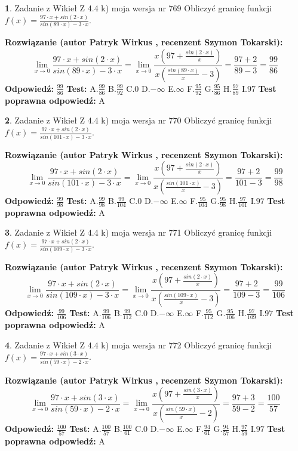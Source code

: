 \documentclass[12pt, a4paper]{article}
\theoremstyle{definition} %
\newtheorem{zad}{}
\newcommand{\zadStart}[1]{\begin{zad}#1\newline}
\newcommand{\zadStop}{\end{zad}}
\newcommand{\rozwStart}[2]{\noindent \textbf{Rozwiązanie (autor #1 , recenzent #2): }\newline}
\newcommand{\rozwStop}{\newline}
\newcommand{\odpStart}{\noindent \textbf{Odpowiedź:}\newline}
\newcommand{\odpStop}{\newline}
\newcommand{\testStart}{\noindent \textbf{Test:}\newline}
\newcommand{\testStop}{\newline}
\newcommand{\kluczStart}{\noindent \textbf{Test poprawna odpowiedź:}\newline}
\newcommand{\kluczStop}{\newline}
\begin{document}
\zadStart{Zadanie z Wikieł Z 4.4 k) moja wersja nr 769}
Obliczyć granicę funkcji $f(x)=\frac{97\cdot x +sin(2\cdot x)}{sin(89\cdot x) -3\cdot x}$.
\zadStop
\rozwStart{Patryk Wirkus}{Szymon Tokarski}
$$\lim\limits_{x\to 0}\frac{97\cdot x +sin(2\cdot x)}{sin(89\cdot x) -3\cdot x}
=\lim\limits_{x\to 0}\frac{x(97+\frac{sin(2\cdot x)}{x})}{x(\frac{sin(89\cdot x)}{x}-3)}
=\frac{97+2}{89-3} = \frac{99}{86}$$
\rozwStop
\odpStart
$\frac{99}{86}$
\odpStop
\testStart
A.$\frac{99}{86}$
B.$\frac{99}{92}$
C.$0$
D.$-\infty$
E.$\infty$
F.$\frac{95}{92}$
G.$\frac{95}{86}$
H.$\frac{97}{89}$
I.$97$
\testStop
\kluczStart
A
\kluczStop



\zadStart{Zadanie z Wikieł Z 4.4 k) moja wersja nr 770}
Obliczyć granicę funkcji $f(x)=\frac{97\cdot x +sin(2\cdot x)}{sin(101\cdot x) -3\cdot x}$.
\zadStop
\rozwStart{Patryk Wirkus}{Szymon Tokarski}
$$\lim\limits_{x\to 0}\frac{97\cdot x +sin(2\cdot x)}{sin(101\cdot x) -3\cdot x}
=\lim\limits_{x\to 0}\frac{x(97+\frac{sin(2\cdot x)}{x})}{x(\frac{sin(101\cdot x)}{x}-3)}
=\frac{97+2}{101-3} = \frac{99}{98}$$
\rozwStop
\odpStart
$\frac{99}{98}$
\odpStop
\testStart
A.$\frac{99}{98}$
B.$\frac{99}{104}$
C.$0$
D.$-\infty$
E.$\infty$
F.$\frac{95}{104}$
G.$\frac{95}{98}$
H.$\frac{97}{101}$
I.$97$
\testStop
\kluczStart
A
\kluczStop



\zadStart{Zadanie z Wikieł Z 4.4 k) moja wersja nr 771}
Obliczyć granicę funkcji $f(x)=\frac{97\cdot x +sin(2\cdot x)}{sin(109\cdot x) -3\cdot x}$.
\zadStop
\rozwStart{Patryk Wirkus}{Szymon Tokarski}
$$\lim\limits_{x\to 0}\frac{97\cdot x +sin(2\cdot x)}{sin(109\cdot x) -3\cdot x}
=\lim\limits_{x\to 0}\frac{x(97+\frac{sin(2\cdot x)}{x})}{x(\frac{sin(109\cdot x)}{x}-3)}
=\frac{97+2}{109-3} = \frac{99}{106}$$
\rozwStop
\odpStart
$\frac{99}{106}$
\odpStop
\testStart
A.$\frac{99}{106}$
B.$\frac{99}{112}$
C.$0$
D.$-\infty$
E.$\infty$
F.$\frac{95}{112}$
G.$\frac{95}{106}$
H.$\frac{97}{109}$
I.$97$
\testStop
\kluczStart
A
\kluczStop



\zadStart{Zadanie z Wikieł Z 4.4 k) moja wersja nr 772}
Obliczyć granicę funkcji $f(x)=\frac{97\cdot x +sin(3\cdot x)}{sin(59\cdot x) -2\cdot x}$.
\zadStop
\rozwStart{Patryk Wirkus}{Szymon Tokarski}
$$\lim\limits_{x\to 0}\frac{97\cdot x +sin(3\cdot x)}{sin(59\cdot x) -2\cdot x}
=\lim\limits_{x\to 0}\frac{x(97+\frac{sin(3\cdot x)}{x})}{x(\frac{sin(59\cdot x)}{x}-2)}
=\frac{97+3}{59-2} = \frac{100}{57}$$
\rozwStop
\odpStart
$\frac{100}{57}$
\odpStop
\testStart
A.$\frac{100}{57}$
B.$\frac{100}{61}$
C.$0$
D.$-\infty$
E.$\infty$
F.$\frac{94}{61}$
G.$\frac{94}{57}$
H.$\frac{97}{59}$
I.$97$
\testStop
\kluczStart
A
\kluczStop
\end{document}
